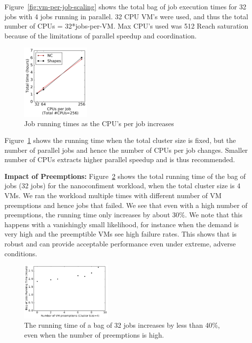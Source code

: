 Figure~\ref{fig:vm-per-job-scaling} shows the total bag of job execution times for 32 jobs with 4 jobs running in parallel.
32 CPU VM's were used, and thus the total number of CPUs = 32*jobs-per-VM. Max CPU's used was 512 
Reach saturation because of the limitations of parallel speedup and coordination. 


\begin{figure}
  \includegraphics[width=0.3\textwidth]{../graphs/par-scaling.pdf}
  \caption{Job running times as the CPU's per job increases}
  \label{fig:par-scaling}
\end{figure}

Figure~\ref{fig:par-scaling} shows the running time when the total cluster size is fixed, but the number of parallel jobs and hence the number of CPUs per job changes. Smaller number of CPUs extracts higher parallel speedup and is thus recommended.


\noindent \textbf{Impact of Preemptions:} Figure~\ref{fig:fails-time} shows the total running time of the bag of jobs (32 jobs) for the nanoconfiment workload, when the total cluster size is 4 VMs. We ran the workload multiple times with different number of VM preemptions and hence jobs that failed. We see that even with a high number of preemptions, the running time only increases by about 30\%.
We note that this happens with a vanishingly small likelihood, for instance when the demand is very high and the preemptible VMs see high failure rates.
This shows that \sysname is robust and can provide acceptable performance even under extreme, adverse conditions. 

\begin{figure}[t]
  \centering 
  \includegraphics[width=0.4\textwidth]{../graphs/confin-fails-vs-time.pdf}
  \caption{The running time of a bag of 32 jobs increases by less than 40\%, even when the number of preemptions is high.}
  \label{fig:fails-time}
\end{figure}

